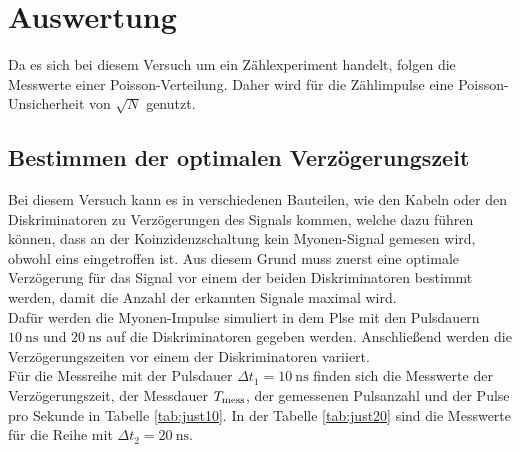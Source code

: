 \newpage 
\section{Auswertung}

\noindent
Da es sich bei diesem Versuch um ein Zählexperiment handelt, folgen die Messwerte einer Poisson-Verteilung. 
Daher wird für die Zählimpulse eine Poisson-Unsicherheit von $\sqrt{N}$ genutzt.

\subsection{Bestimmen der optimalen Verzögerungszeit}

\noindent
Bei diesem Versuch kann es in verschiedenen Bauteilen, wie den Kabeln oder den Diskriminatoren zu Verzögerungen des Signals kommen,
welche dazu führen können, dass an der Koinzidenzschaltung kein Myonen-Signal gemesen wird, obwohl eins eingetroffen ist.
Aus diesem Grund muss zuerst eine optimale Verzögerung für das Signal vor einem der beiden Diskriminatoren bestimmt werden, 
damit die Anzahl der erkannten Signale maximal wird.\\
Dafür werden die Myonen-Impulse simuliert in dem Plse mit den Pulsdauern $\SI{10}{\nano\second}$ und $\SI{20}{\nano\second}$ auf die Diskriminatoren gegeben werden.
Anschließend werden die Verzögerungszeiten vor einem der Diskriminatoren variiert. \\
Für die Messreihe mit der Pulsdauer $ \Delta t_1 = \SI{10}{\nano\second}$ finden sich die Messwerte der Verzögerungszeit, der Messdauer $T_{\text{mess}}$, der gemessenen Pulsanzahl und der Pulse pro Sekunde in Tabelle \ref{tab:just10}.
In der Tabelle \ref{tab:just20} sind die Messwerte für die Reihe mit $ \Delta t_2 =\SI{20}{\nano\second}$.


